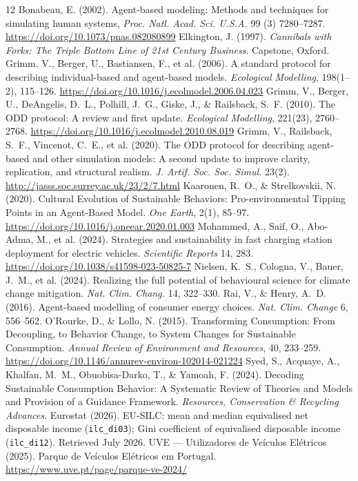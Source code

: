 \documentclass[11pt]{article}
\begin{document}
\begin{thebibliography}{12}
 Bonabeau, E. (2002). Agent-based modeling: Methods
and techniques for simulating human systems, \emph{Proc. Natl. Acad. Sci.
U.S.A.} 99 (3) 7280--7287.
\url{https://doi.org/10.1073/pnas.082080899}
 Elkington, J. (1997). \emph{Cannibals with Forks:
The Triple Bottom Line of 21st Century Business}. Capstone, Oxford.
 Grimm, V., Berger, U., Bastiansen, F., et al. (2006). A
standard protocol for describing individual-based and agent-based models.
\emph{Ecological Modelling}, 198(1--2), 115--126.
\url{https://doi.org/10.1016/j.ecolmodel.2006.04.023}
 Grimm, V., Berger, U., DeAngelis, D.~L., Polhill,
J.~G., Giske, J., \& Railsback, S.~F. (2010). The ODD protocol: A review
and first update. \emph{Ecological Modelling}, 221(23), 2760--2768.
\url{https://doi.org/10.1016/j.ecolmodel.2010.08.019}
 Grimm, V., Railsback, S.~F., Vincenot, C.~E., et al.
(2020). The ODD protocol for describing agent-based and other simulation
models: A second update to improve clarity, replication, and structural
realism. \emph{J. Artif. Soc. Soc. Simul.} 23(2).
\url{http://jasss.soc.surrey.ac.uk/23/2/7.html}
 Kaaronen, R.~O., \& Strelkovskii, N. (2020).
Cultural Evolution of Sustainable Behaviors: Pro-environmental Tipping
Points in an Agent-Based Model. \emph{One Earth}, 2(1), 85--97.
\url{https://doi.org/10.1016/j.oneear.2020.01.003}
 Mohammed, A., Saif, O., Abo-Adma, M., et al. (2024).
Strategies and sustainability in fast charging station deployment for
electric vehicles. \emph{Scientific Reports} 14, 283.
\url{https://doi.org/10.1038/s41598-023-50825-7}
 Nielsen, K.~S., Cologna, V., Bauer, J.~M., et al.
(2024). Realizing the full potential of behavioural science for climate
change mitigation. \emph{Nat. Clim. Chang.} 14, 322--330.
 Rai, V., \& Henry, A.~D. (2016). Agent-based modelling of
consumer energy choices. \emph{Nat. Clim. Change} 6, 556--562.
 O'Rourke, D., \& Lollo, N. (2015). Transforming
Consumption: From Decoupling, to Behavior Change, to System Changes for
Sustainable Consumption. \emph{Annual Review of Environment and Resources},
40, 233--259. \url{https://doi.org/10.1146/annurev-environ-102014-021224}
 Syed, S., Acquaye, A., Khalfan, M.~M., Obuobisa-Darko,
T., \& Yamoah, F. (2024). Decoding Sustainable Consumption Behavior: A
Systematic Review of Theories and Models and Provision of a Guidance
Framework. \emph{Resources, Conservation \& Recycling Advances}.
 Eurostat (2026). EU-SILC: mean and median equivalised
net disposable income (\texttt{ilc\_di03}); Gini coefficient of equivalised
disposable income (\texttt{ilc\_di12}). Retrieved July 2026.
 UVE --- Utilizadores de Ve\'iculos El\'etricos (2025).
Parque de Ve\'iculos El\'etricos em Portugal.
\url{https://www.uve.pt/page/parque-ve-2024/}
\end{thebibliography}
\end{document}
